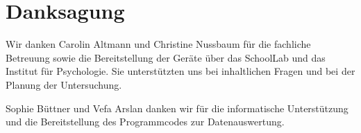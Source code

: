 \documentclass[headings=small,a4paper, 12pt]{scrreprt}
\begin{document}
\glsenablehyper
\hypersetup{pageanchor=true}


\printglossary[type=\acronymtype, title=Abkürzungsverzeichnis, style=acrostyle]
\tableofcontents
\listoffigures %

\cleardoublepage
{}

%
















\printglossary



\printbibliography[heading=bibintoc, title={Quellenverzeichnis}]

	

\chapter*{Danksagung}
Wir danken Carolin Altmann und Christine Nussbaum für die fachliche Betreuung sowie die Bereitstellung der Geräte über das SchoolLab und das Institut für Psychologie. Sie unterstützten uns bei inhaltlichen Fragen und bei der Planung der Untersuchung.

Sophie Büttner und Vefa Arslan danken wir für die informatische Unterstützung und die Bereitstellung des Programmcodes zur Datenauswertung.
\end{document}
